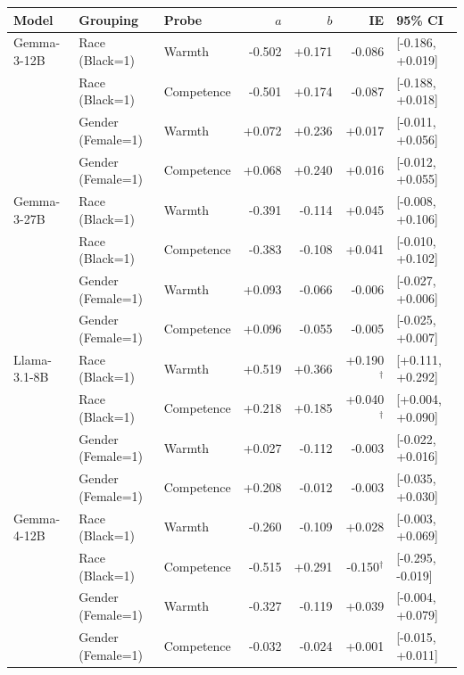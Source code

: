 \begin{table}[p]
\centering
\scriptsize
\setlength{\tabcolsep}{4pt}
\begin{tabular}{@{}lllrrrl@{}}
\toprule
Model & Grouping & Probe & $a$ & $b$ & IE & 95\% CI \\
\midrule
Gemma-3-12B & Race (Black=1) & Warmth & -0.502 & +0.171 & -0.086 & [-0.186, +0.019] \\
 & Race (Black=1) & Competence & -0.501 & +0.174 & -0.087 & [-0.188, +0.018] \\
 & Gender (Female=1) & Warmth & +0.072 & +0.236 & +0.017 & [-0.011, +0.056] \\
 & Gender (Female=1) & Competence & +0.068 & +0.240 & +0.016 & [-0.012, +0.055] \\
\addlinespace
Gemma-3-27B & Race (Black=1) & Warmth & -0.391 & -0.114 & +0.045 & [-0.008, +0.106] \\
 & Race (Black=1) & Competence & -0.383 & -0.108 & +0.041 & [-0.010, +0.102] \\
 & Gender (Female=1) & Warmth & +0.093 & -0.066 & -0.006 & [-0.027, +0.006] \\
 & Gender (Female=1) & Competence & +0.096 & -0.055 & -0.005 & [-0.025, +0.007] \\
\addlinespace
Llama-3.1-8B & Race (Black=1) & Warmth & +0.519 & +0.366 & +0.190$^{\dagger}$ & [+0.111, +0.292] \\
 & Race (Black=1) & Competence & +0.218 & +0.185 & +0.040$^{\dagger}$ & [+0.004, +0.090] \\
 & Gender (Female=1) & Warmth & +0.027 & -0.112 & -0.003 & [-0.022, +0.016] \\
 & Gender (Female=1) & Competence & +0.208 & -0.012 & -0.003 & [-0.035, +0.030] \\
\addlinespace
Gemma-4-12B & Race (Black=1) & Warmth & -0.260 & -0.109 & +0.028 & [-0.003, +0.069] \\
 & Race (Black=1) & Competence & -0.515 & +0.291 & -0.150$^{\dagger}$ & [-0.295, -0.019] \\
 & Gender (Female=1) & Warmth & -0.327 & -0.119 & +0.039 & [-0.004, +0.079] \\
 & Gender (Female=1) & Competence & -0.032 & -0.024 & +0.001 & [-0.015, +0.011] \\

\end{tabular}
\end{table}
